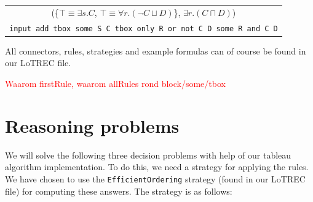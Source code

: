 \documentclass[11pt]{article} %
\begin{document}
\begin{table}[h]
\begin{center}
\begin{tabular}{c}
(\{$\top \equiv \exists s.C$, $\top \equiv \forall r.(\neg C \sqcup D)$\}, $\exists r.(C \sqcap D)$)\\
\texttt{input add tbox some S C tbox only R or not C D some R and C D}\\
\end{tabular}
\end{center}
\end{table}

All connectors, rules, strategies and example formulas can of course be found in our LoTREC file.

\textcolor{red}{Waarom firstRule, waarom allRules rond block/some/tbox}

\section{Reasoning problems}
\label{sec:reasoning}

We will solve the following three decision problems with help of our tableau algorithm implementation. To do this, we need a strategy for applying the rules. We have chosen to use the \texttt{EfficientOrdering} strategy (found in our LoTREC file) for computing these answers. The strategy is as follows:
\end{document}
